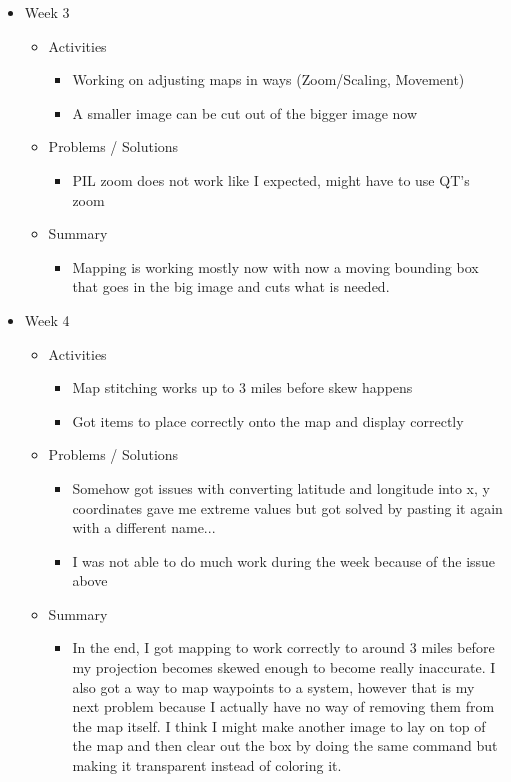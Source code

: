 \begin{itemize}
\begin{itemize}
\end{itemize}
\item{Week 3}
\begin{itemize}
\item Activities
\begin{itemize}
\item Working on adjusting maps in ways (Zoom/Scaling, Movement) 
\item A smaller image can be cut out of the bigger image now
\end{itemize}
\item Problems / Solutions
\begin{itemize}
\item PIL zoom does not work like I expected, might have to use QT's zoom
\end{itemize}
\item Summary
\begin{itemize}
\item Mapping is working mostly now with now a moving bounding box that goes in the big image and cuts what is needed.
\end{itemize}
\end{itemize}
\item{Week 4}
\begin{itemize}
\item Activities
\begin{itemize}
\item Map stitching works up to 3 miles before skew happens
\item Got items to place correctly onto the map and display correctly
\end{itemize}
\item Problems / Solutions
\begin{itemize}
\item Somehow got issues with converting latitude and longitude into x, y coordinates gave me extreme values but got solved by pasting it again with a different name...
\item I was not able to do much work during the week because of the issue above
\end{itemize}
\item Summary
\begin{itemize}
\item In the end, I got mapping to work correctly to around 3 miles before my projection becomes skewed enough to become really inaccurate. I also got a way to map waypoints to a system, however that is my next problem because I actually have no way of removing them from the map itself. I think I might make another image to lay on top of the map and then clear out the box by doing the same command but making it transparent instead of coloring it.

\end{itemize}
\end{itemize}
\end{itemize}
